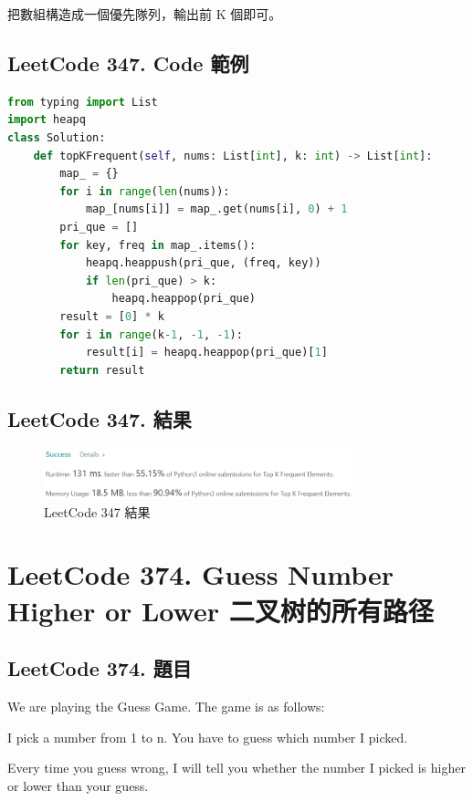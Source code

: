 \documentclass[10pt,UTF8]{ctexart}
\begin{document}
把數組構造成一個優先隊列，輸出前 K 個即可。

\subsection{LeetCode 347. Code 範例}

\begin{lstlisting}[language={python}]
from typing import List 
import heapq
class Solution:
    def topKFrequent(self, nums: List[int], k: int) -> List[int]:
        map_ = {}
        for i in range(len(nums)):
            map_[nums[i]] = map_.get(nums[i], 0) + 1
        pri_que = []
        for key, freq in map_.items():
            heapq.heappush(pri_que, (freq, key))
            if len(pri_que) > k: 
                heapq.heappop(pri_que)
        result = [0] * k
        for i in range(k-1, -1, -1):
            result[i] = heapq.heappop(pri_que)[1]
        return result 
\end{lstlisting}

\subsection{LeetCode 347. 結果}

\begin{figure}[H]
\centering 
\includegraphics[width=0.80\textwidth]{lc-347-o.png} 
\caption{LeetCode 347 結果}
\label{Test}
\end{figure}


\newpage

\section{LeetCode 374. Guess Number Higher or Lower 二叉树的所有路径}

\subsection{LeetCode 374. 題目}

We are playing the Guess Game. The game is as follows:

I pick a number from 1 to n. You have to guess which number I picked.

Every time you guess wrong, I will tell you whether the number I picked is higher or lower than your guess.
\end{document}
